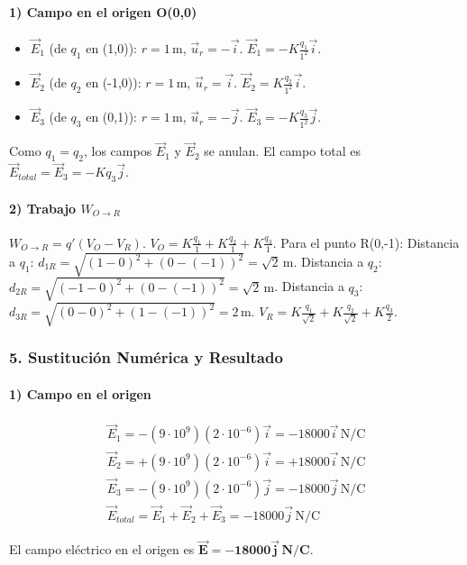 \paragraph{1) Campo en el origen O(0,0)}
\begin{itemize}
    \item $\vec{E}_1$ (de $q_1$ en (1,0)): $r=1\,\text{m}$, $\vec{u}_r = -\vec{i}$. $\vec{E}_1 = -K\frac{q_1}{1^2}\vec{i}$.
    \item $\vec{E}_2$ (de $q_2$ en (-1,0)): $r=1\,\text{m}$, $\vec{u}_r = \vec{i}$. $\vec{E}_2 = K\frac{q_2}{1^2}\vec{i}$.
    \item $\vec{E}_3$ (de $q_3$ en (0,1)): $r=1\,\text{m}$, $\vec{u}_r = -\vec{j}$. $\vec{E}_3 = -K\frac{q_3}{1^2}\vec{j}$.
\end{itemize}
Como $q_1=q_2$, los campos $\vec{E}_1$ y $\vec{E}_2$ se anulan. El campo total es $\vec{E}_{total} = \vec{E}_3 = -Kq_3\vec{j}$.
\paragraph{2) Trabajo $W_{O \to R}$}
$W_{O \to R} = q'(V_O - V_R)$.
$V_O = K\frac{q_1}{1} + K\frac{q_2}{1} + K\frac{q_3}{1}$.
Para el punto R(0,-1):
Distancia a $q_1$: $d_{1R}=\sqrt{(1-0)^2+(0-(-1))^2} = \sqrt{2}\,\text{m}$.
Distancia a $q_2$: $d_{2R}=\sqrt{(-1-0)^2+(0-(-1))^2} = \sqrt{2}\,\text{m}$.
Distancia a $q_3$: $d_{3R}=\sqrt{(0-0)^2+(1-(-1))^2} = 2\,\text{m}$.
$V_R = K\frac{q_1}{\sqrt{2}} + K\frac{q_2}{\sqrt{2}} + K\frac{q_3}{2}$.

\subsubsection*{5. Sustitución Numérica y Resultado}
\paragraph{1) Campo en el origen}
\begin{gather}
    \vec{E}_1 = -(9\cdot10^9)(2\cdot10^{-6})\vec{i} = -18000\vec{i}\,\text{N/C} \\
    \vec{E}_2 = +(9\cdot10^9)(2\cdot10^{-6})\vec{i} = +18000\vec{i}\,\text{N/C} \\
    \vec{E}_3 = -(9\cdot10^9)(2\cdot10^{-6})\vec{j} = -18000\vec{j}\,\text{N/C} \\
    \vec{E}_{total} = \vec{E}_1 + \vec{E}_2 + \vec{E}_3 = -18000\vec{j}\,\text{N/C}
\end{gather}
\begin{cajaresultado}
El campo eléctrico en el origen es $\boldsymbol{\vec{E} = -18000\vec{j} \, \textbf{N/C}}$.
\end{cajaresultado}
